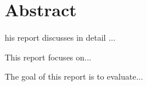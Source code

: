 
\chapter*{Abstract}
\begin{SingleSpace}
his report discusses in detail ... 

This report focuses on...

The goal of this report is to evaluate...
\end{SingleSpace}